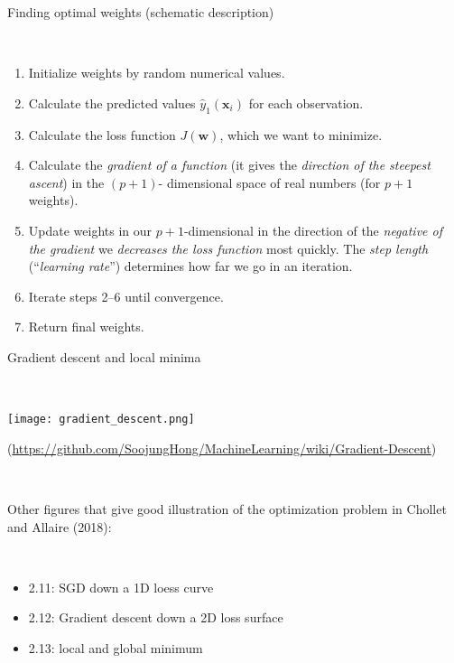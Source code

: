 \documentclass[10pt,ignorenonframetext,]{beamer}
\providecommand{\tightlist}{%
  \setlength{\itemsep}{0pt}\setlength{\parskip}{0pt}}
\begin{document}
\begin{frame}

\begin{block}{Finding optimal weights (schematic description)}

\(~\)

\begin{enumerate}
\item
  Initialize weights by random numerical values.
\item
  Calculate the predicted values \(\hat{y}_1({\boldsymbol x}_i)\) for
  each observation.
\item
  Calculate the loss function \(J(\boldsymbol{w})\), which we want to
  minimize.
\item
  Calculate the \emph{gradient of a function} (it gives the
  \emph{direction of the steepest ascent}) in the \((p+1)\)- dimensional
  space of real numbers (for \(p+1\) weights).
\item
  Update weights in our \(p+1\)-dimensional in the direction of the
  \emph{negative of the gradient} we \emph{decreases the loss function}
  most quickly. The \emph{step length} (``\emph{learning rate}'')
  determines how far we go in an iteration.
\item
  Iterate steps 2--6 until convergence.
\item
  Return final weights.
\end{enumerate}

\end{block}

\end{frame}

\begin{frame}

\begin{block}{Gradient descent and local minima}

\(~\)

\center

\texttt{[image: gradient\_descent.png]}

\tiny (\url{https://github.com/SoojungHong/MachineLearning/wiki/Gradient-Descent})

\(~\) \(~\)

\flushleft
\normalsize

Other figures that give good illustration of the optimization problem in
Chollet and Allaire (2018):

\(~\)

\begin{itemize}
\tightlist
\item
  2.11: SGD down a 1D loess curve
\item
  2.12: Gradient descent down a 2D loss surface
\item
  2.13: local and global minimum
\end{itemize}

\end{block}

\end{frame}
\end{document}
